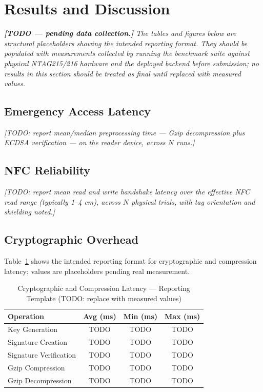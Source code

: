 \documentclass[conference]{IEEEtran}
\begin{document}
\section{Results and Discussion}
\textit{\textbf{[TODO --- pending data collection.]} The tables and figures below are structural placeholders showing the intended reporting format. They should be populated with measurements collected by running the benchmark suite against physical NTAG215/216 hardware and the deployed backend before submission; no results in this section should be treated as final until replaced with measured values.}

\subsection{Emergency Access Latency}
\textit{[TODO: report mean/median preprocessing time --- Gzip decompression plus ECDSA verification --- on the reader device, across $N$ runs.]}

\subsection{NFC Reliability}
\textit{[TODO: report mean read and write handshake latency over the effective NFC read range (typically 1--4 cm), across $N$ physical trials, with tag orientation and shielding noted.]}

\subsection{Cryptographic Overhead}
Table~\ref{tab:crypto_times} shows the intended reporting format for cryptographic and compression latency; values are placeholders pending real measurement.

\begin{table}[htbp]
\caption{Cryptographic and Compression Latency --- Reporting Template (TODO: replace with measured values)}
\begin{center}
\begin{tabular}{lccc}
\toprule
\textbf{Operation} & \textbf{Avg (ms)} & \textbf{Min (ms)} & \textbf{Max (ms)} \\
\midrule
Key Generation & TODO & TODO & TODO \\
Signature Creation & TODO & TODO & TODO \\
Signature Verification & TODO & TODO & TODO \\
Gzip Compression & TODO & TODO & TODO \\
Gzip Decompression & TODO & TODO & TODO \\
\bottomrule
\end{tabular}
\label{tab:crypto_times}
\end{center}
\end{table}
\end{document}

